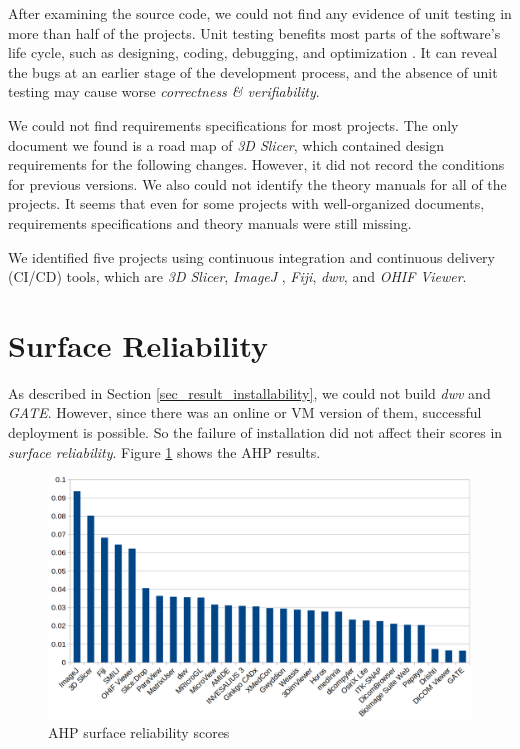 After examining the source code, we could not find any evidence of unit testing in more than half of the projects. Unit testing benefits most parts of the software's life cycle, such as designing, coding, debugging, and optimization \cite{Hamill2004}. It can reveal the bugs at an earlier stage of the development process, and the absence of unit testing may cause worse \textit{correctness \& verifiability}.

We could not find requirements specifications for most projects. The only document we found is a road map of \textit{3D Slicer}, which contained design requirements for the following changes. However, it did not record the conditions for previous versions. We also could not identify the theory manuals for all of the projects. It seems that even for some projects with well-organized documents, requirements specifications and theory manuals were still missing.

We identified five projects using continuous integration and continuous delivery (CI/CD) tools, which are \textit{3D Slicer}, \textit{ImageJ
}, \textit{Fiji}, \textit{dwv}, and \textit{OHIF Viewer}.

\section{Surface Reliability}
As described in Section \ref{sec_result_installability}, we could not build \textit{dwv} and \textit{GATE}. However, since there was an online or VM version of them, successful deployment is possible. So the failure of installation did not affect their scores in \textit{surface reliability}. Figure \ref{fg_reliability_scores} shows the AHP results.

\begin{figure}[H]
\includegraphics[scale=0.38]{figures/reliability_scores.png}
\caption{AHP surface reliability scores}
\label{fg_reliability_scores}
\end{figure}

